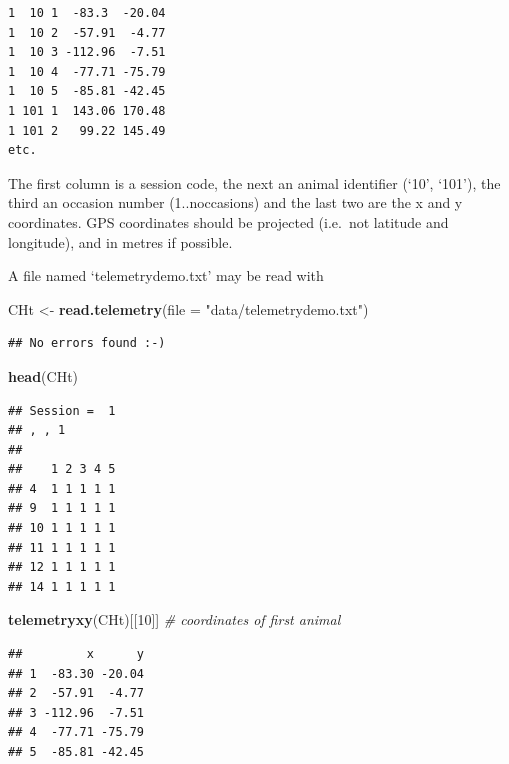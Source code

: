 \documentclass[
]{book}
\newenvironment{Shaded}{\begin{snugshade}}{\end{snugshade}}
\newcommand{\AttributeTok}[1]{\textcolor[rgb]{0.13,0.29,0.53}{#1}}
\newcommand{\CommentTok}[1]{\textcolor[rgb]{0.56,0.35,0.01}{\textit{#1}}}
\newcommand{\FunctionTok}[1]{\textcolor[rgb]{0.13,0.29,0.53}{\textbf{#1}}}
\newcommand{\NormalTok}[1]{#1}
\newcommand{\OtherTok}[1]{\textcolor[rgb]{0.56,0.35,0.01}{#1}}
\newcommand{\StringTok}[1]{\textcolor[rgb]{0.31,0.60,0.02}{#1}}
\begin{document}
\begin{verbatim}
1  10 1  -83.3  -20.04
1  10 2  -57.91  -4.77
1  10 3 -112.96  -7.51
1  10 4  -77.71 -75.79
1  10 5  -85.81 -42.45
1 101 1  143.06 170.48
1 101 2   99.22 145.49
etc.
\end{verbatim}

The first column is a session code, the next an animal identifier (`10', `101'), the third an occasion number (1..noccasions) and the last two are the x and y coordinates. GPS coordinates should be projected (i.e.~not latitude and longitude), and in metres if possible.

A file named `telemetrydemo.txt' may be read with

\begin{Shaded}
\begin{Highlighting}[]
\NormalTok{CHt }\OtherTok{\textless{}{-}} \FunctionTok{read.telemetry}\NormalTok{(}\AttributeTok{file =} \StringTok{"data/telemetrydemo.txt"}\NormalTok{)}
\end{Highlighting}
\end{Shaded}

\begin{verbatim}
## No errors found :-)
\end{verbatim}

\begin{Shaded}
\begin{Highlighting}[]
\FunctionTok{head}\NormalTok{(CHt)}
\end{Highlighting}
\end{Shaded}

\begin{verbatim}
## Session =  1 
## , , 1
## 
##    1 2 3 4 5
## 4  1 1 1 1 1
## 9  1 1 1 1 1
## 10 1 1 1 1 1
## 11 1 1 1 1 1
## 12 1 1 1 1 1
## 14 1 1 1 1 1
\end{verbatim}

\begin{Shaded}
\begin{Highlighting}[]
\FunctionTok{telemetryxy}\NormalTok{(CHt)[[}\StringTok{\textquotesingle{}10\textquotesingle{}}\NormalTok{]]  }\CommentTok{\# coordinates of first animal}
\end{Highlighting}
\end{Shaded}

\begin{verbatim}
##         x      y
## 1  -83.30 -20.04
## 2  -57.91  -4.77
## 3 -112.96  -7.51
## 4  -77.71 -75.79
## 5  -85.81 -42.45
\end{verbatim}
\end{document}
